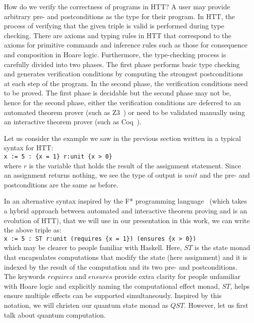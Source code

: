 \documentclass[adraft,creativecommons]{eptcs}
\theoremstyle{definition}
\theoremstyle{remark}
\begin{document}
How do we verify the correctness of programs in HTT? A user may provide arbitrary pre- and postconditions as the type for their program. In HTT, the process of verifying that the given triple is valid is performed during type checking. There are axioms and typing rules in HTT that correspond to the axioms for primitive commands and inference rules such as those for consequence and composition in Hoare logic. Furthermore, the type-checking process is carefully divided into two phases. The first phase performs basic type checking and generates verification conditions by computing the strongest postconditions at each step of the program. In the second phase, the verification conditions need to be proved. The first phase is decidable but the second phase may not be, hence for the second phase, either the verification conditions are deferred to an automated theorem prover (such as Z3~\parencite{z32008}) or need to be validated manually using an interactive theorem prover (such as Coq~\parencite{coq2020}).

Let us consider the example we saw in the previous section written in a typical syntax for HTT:\medskip\\
\indent\indent\lstinline[language=QHaskell]!x := 5 : {x = 1} r:unit {x > 0}!
\medskip\\where $r$ is the variable that holds the result of the assignment statement. Since an assignment returns nothing, we see the type of output is $unit$ and the pre- and postconditions are the same as before.

In an alternative syntax inspired by the F* programming language~\parencite{fstar} (which takes a hybrid approach between automated and interactive theorem proving and is an evolution of HTT), that we will use in our presentation in this work, we can write the above triple as:\medskip\\
\indent\indent\lstinline[language=QHaskell]!x := 5 : ST r:unit (requires {x = 1}) (ensures {x > 0})!
\medskip\\which may be clearer to people familiar with Haskell. Here, $ST$ is the state monad that encapsulates computations that modify the state (here assignment) and it is indexed by the result of the computation and its two pre- and postconditions. The keywords $requires$ and $ensures$ provide extra clarity for people unfamiliar with Hoare logic and explicitly naming the computational effect monad, $ST$, helps ensure multiple effects can be supported simultaneously. Inspired by this notation, we will christen our quantum state monad as $QST$. However, let us first talk about quantum computation.
\end{document}
